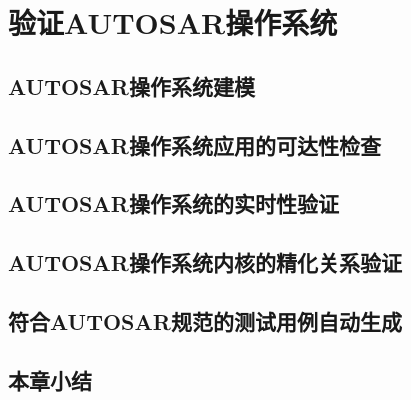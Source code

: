 \chapter{验证AUTOSAR操作系统}

\section{AUTOSAR操作系统建模}
\section{AUTOSAR操作系统应用的可达性检查}
\section{AUTOSAR操作系统的实时性验证}
\section{AUTOSAR操作系统内核的精化关系验证}
\section{符合AUTOSAR规范的测试用例自动生成}
\section{本章小结}

